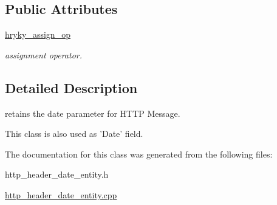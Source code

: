 \subsection*{Public Attributes}
\begin{DoxyCompactItemize}
\item 
\hypertarget{classhryky_1_1http_1_1header_1_1date_1_1_entity_a54eae630ef52f9f4901a2cd7ce5db1cb}{\hyperlink{classhryky_1_1http_1_1header_1_1date_1_1_entity_a54eae630ef52f9f4901a2cd7ce5db1cb}{hryky\-\_\-assign\-\_\-op}}\label{classhryky_1_1http_1_1header_1_1date_1_1_entity_a54eae630ef52f9f4901a2cd7ce5db1cb}

\begin{DoxyCompactList}\small\item\em assignment operator. \end{DoxyCompactList}\end{DoxyCompactItemize}


\subsection{Detailed Description}
retains the date parameter for H\-T\-T\-P Message. 


\begin{DoxyItemize}
\item This class is also used as 'Date' field. 
\end{DoxyItemize}

The documentation for this class was generated from the following files\-:\begin{DoxyCompactItemize}
\item 
http\-\_\-header\-\_\-date\-\_\-entity.\-h\item 
\hyperlink{http__header__date__entity_8cpp}{http\-\_\-header\-\_\-date\-\_\-entity.\-cpp}\end{DoxyCompactItemize}
